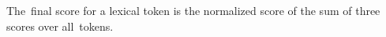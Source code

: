 \vspace{0.02in}
 The~final score for a lexical token is
the normalized score of the sum of three scores over all~tokens.











